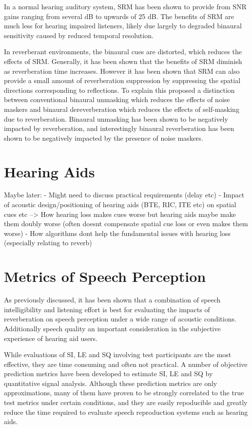 In a normal hearing auditory system, SRM has been shown to provide from SNR gains ranging from several dB to upwards of 25 dB. The benefits of SRM are much less for hearing impaired listeners, likely due largely to degraded binaural sensitivity caused by reduced temporal resolution. 

In reverberant environments, the binaural cues are distorted, which reduces the effects of SRM. Generally, it has been shown that the benefits of SRM diminish as reverberation time increases. However it has been shown that SRM can also provide a small amount of reverberation suppression by suppressing the spatial directions corresponding to reflections. To explain this \cite{leclere2015speech} proposed a distinction between conventional binaural unmasking which reduces the effects of noise maskers and binaural dereverberation which reduces the effects of self-masking due to reverberation. Binaural unmasking has been shown to be negatively impacted by reverberation, and interestingly binaural reverberation has been shown to be negatively impacted by the presence of noise maskers.

\section{Hearing Aids}

Maybe later:
- Might need to discuss practical requirements (delay etc)
- Impact of acoustic design/positioning of hearing aids  (BTE, RIC, ITE etc) on spatial cues etc
	--> How hearing loss makes cues worse but hearing aids maybe make them doubly worse (often doesnt compensate spatial cue loss or even makes them worse)
- How algorithms dont help the fundamental issues with hearing loss (especially relating to reverb)

\section{Metrics of Speech Perception}

As previously discussed, it has been shown that a combination of speech intelligibility and listening effort is best for evaluating the impacts of reverberation on speech perception under a wide range of acoustic conditions. Additionally speech quality an important consideration in the subjective experience of hearing aid users.

While evaluations of SI, LE and SQ involving test participants are the most effective, they are time consuming and often not practical. A number of objective prediction metrics have been developed to estimate SI, LE and SQ by quantitative signal analysis. Although these prediction metrics are only approximations, many of them have proven to be strongly correlated to the true test metrics under certain conditions, and they are easily repoducible and greatly reduce the time required to evaluate speech reproduction systems such as hearing aids. 

